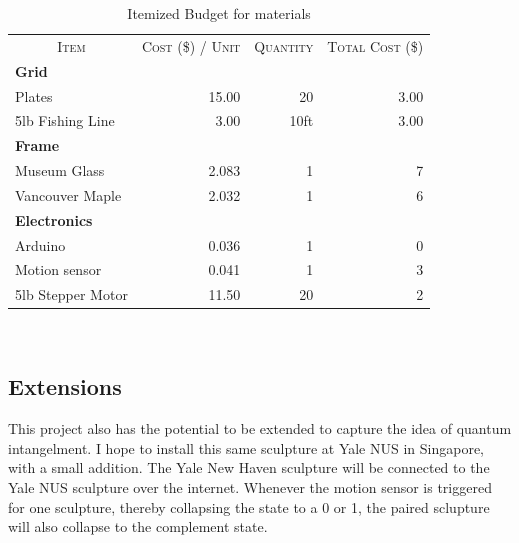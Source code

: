 \begin{table}[h!]
\centering
\caption{Itemized Budget for materials}
\label{table:results}
\vspace{0.4em}
\begin{tabular}{|l|r|r|r|}
\hline
\multicolumn{1}{|c|}{\multirow{2}{*}{\textsc{Item}}} 
  & \multicolumn{1}{c|}{\multirow{2}{*}{\textsc{Cost} \scriptsize{(\$)} \textsc{/ Unit}}}
  & \multicolumn{1}{c|}{\multirow{2}{*}{\textsc{Quantity}}}
  & \multicolumn{1}{c|}{\multirow{2}{*}{\textsc{Total Cost} \scriptsize{(\$)}}} \\ 
& \multicolumn{1}{c|}{\textsc{}} & \multicolumn{1}{c|}{\textsc{}} & \\
\hline \hline
\textbf{Grid} & & & \\[-0.2em]
\quad Plates & 15.00 & 20 & 3.00  \\
\quad 5lb Fishing Line & 3.00 & 10ft & 3.00  \\
\hline 
\textbf{Frame} & & & \\[-0.2em]
\quad Museum Glass  & 2.083   & 1 & 7  \\    
\quad Vancouver Maple  & 2.032   & 1 & 6  \\
\hline 
\textbf{Electronics} & & & \\[-0.2em]
\quad Arduino   & 0.036   & 1 & 0  \\ %
\quad Motion sensor & 0.041   & 1 & 3  \\ %
\quad 5lb Stepper Motor & 11.50 & 20 & 2  \\
\hline 
\end{tabular}
\vspace{-1.5em}
\ 
\end{table}

\subsection{Extensions}

This project also has the potential to be extended to capture the idea of quantum intangelment.
I hope to install this same sculpture at Yale NUS in Singapore, with a small addition.
The Yale New Haven sculpture will be connected to the Yale NUS sculpture over the internet.
Whenever the motion sensor is triggered for one sculpture, thereby collapsing the state to a 0 or 1, the paired sclupture will also collapse to the complement state.



